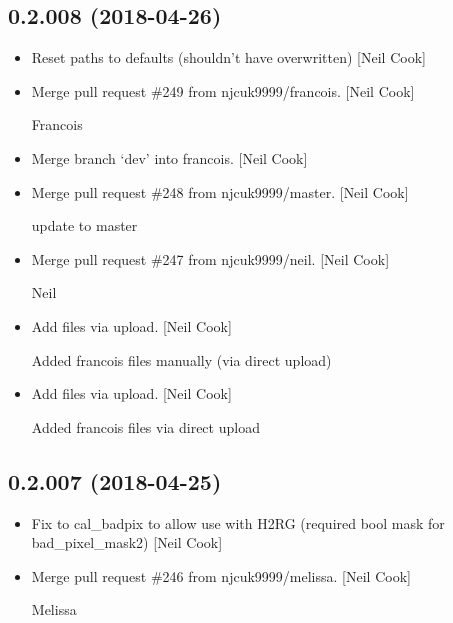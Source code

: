 \documentclass[a4paper,10pt,english]{report}
\begin{document}
\subsection{0.2.008 (2018-04-26)}
\label{\detokenize{misc/changelog:id451}}\begin{itemize}
\item {} 
Reset paths to defaults (shouldn’t have overwritten) {[}Neil Cook{]}

\item {} 
Merge pull request \#249 from njcuk9999/francois. {[}Neil Cook{]}

Francois

\item {} 
Merge branch ‘dev’ into francois. {[}Neil Cook{]}

\item {} 
Merge pull request \#248 from njcuk9999/master. {[}Neil Cook{]}

update to master

\item {} 
Merge pull request \#247 from njcuk9999/neil. {[}Neil Cook{]}

Neil

\item {} 
Add files via upload. {[}Neil Cook{]}

Added francois files manually (via direct upload)

\item {} 
Add files via upload. {[}Neil Cook{]}

Added francois files via direct upload

\end{itemize}


\subsection{0.2.007 (2018-04-25)}
\label{\detokenize{misc/changelog:id452}}\begin{itemize}
\item {} 
Fix to cal\_badpix to allow use with H2RG (required bool mask for
bad\_pixel\_mask2) {[}Neil Cook{]}

\item {} 
Merge pull request \#246 from njcuk9999/melissa. {[}Neil Cook{]}

Melissa

\end{itemize}
\end{document}
